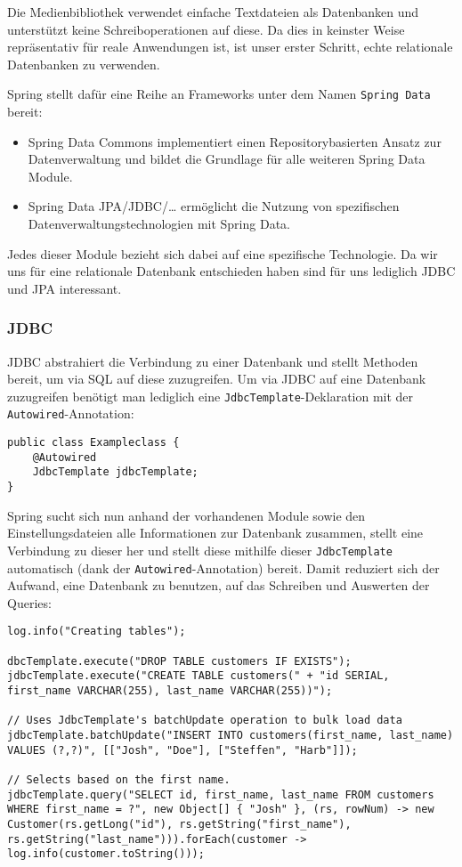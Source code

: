 \documentclass{article}
\begin{document}
Die Medienbibliothek verwendet einfache Textdateien als Datenbanken und unterstützt keine Schreiboperationen auf diese.
Da dies in keinster Weise repräsentativ für reale Anwendungen ist, ist unser erster Schritt, echte relationale Datenbanken zu verwenden.

Spring stellt dafür eine Reihe an Frameworks unter dem Namen \texttt{Spring Data} bereit:
\begin{itemize}
        \item{Spring Data Commons} {implementiert einen Repositorybasierten Ansatz zur Datenverwaltung und bildet die Grundlage für alle weiteren Spring Data Module.}
        \item{Spring Data JPA/JDBC/\ldots} ermöglicht die Nutzung von spezifischen Datenverwaltungstechnologien mit Spring Data.
\end{itemize}

Jedes dieser Module bezieht sich dabei auf eine spezifische Technologie.
Da wir uns für eine relationale Datenbank entschieden haben sind für uns lediglich JDBC und JPA interessant.

\subsubsection{JDBC}

JDBC abstrahiert die Verbindung zu einer Datenbank und stellt Methoden bereit, um via SQL auf diese zuzugreifen.
Um via JDBC auf eine Datenbank zuzugreifen benötigt man lediglich eine \texttt{JdbcTemplate}-Deklaration mit der \texttt{Autowired}-Annotation:

\begin{lstlisting}
public class Exampleclass {
    @Autowired
    JdbcTemplate jdbcTemplate;
}
\end{lstlisting}

Spring sucht sich nun anhand der vorhandenen Module sowie den Einstellungsdateien alle Informationen zur Datenbank zusammen, stellt eine Verbindung zu dieser her und stellt diese mithilfe dieser \texttt{JdbcTemplate} automatisch (dank der \texttt{Autowired}-Annotation) bereit.
Damit reduziert sich der Aufwand, eine Datenbank zu benutzen, auf das Schreiben und Auswerten der Queries:

\begin{lstlisting}
log.info("Creating tables");

dbcTemplate.execute("DROP TABLE customers IF EXISTS");
jdbcTemplate.execute("CREATE TABLE customers(" + "id SERIAL, first_name VARCHAR(255), last_name VARCHAR(255))");

// Uses JdbcTemplate's batchUpdate operation to bulk load data
jdbcTemplate.batchUpdate("INSERT INTO customers(first_name, last_name) VALUES (?,?)", [["Josh", "Doe"], ["Steffen", "Harb"]]);

// Selects based on the first name.
jdbcTemplate.query("SELECT id, first_name, last_name FROM customers WHERE first_name = ?", new Object[] { "Josh" }, (rs, rowNum) -> new Customer(rs.getLong("id"), rs.getString("first_name"), rs.getString("last_name"))).forEach(customer -> log.info(customer.toString()));
\end{lstlisting}
\end{document}
